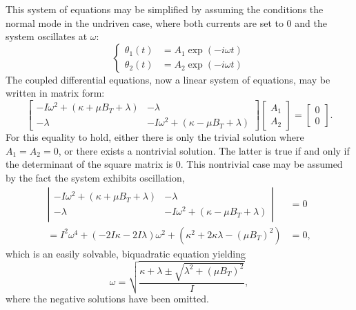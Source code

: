 \documentclass{article}
\begin{document}
This system of equations may be simplified by assuming the conditions the normal mode in the undriven case, where both currents are set to 0 and the system oscillates at $\omega$:
\begin{equation*}
  \begin{cases}
    \theta_1(t) &= A_1 \exp(-i\omega t) \\
    \theta_2(t) &= A_2 \exp(-i\omega t)
  \end{cases}
\end{equation*}
The coupled differential equations, now a linear system of equations, may be written in matrix form:
\begin{equation*}
  \left[
    \begin{matrix}
      -I\omega^2+(\kappa + \mu B_T + \lambda)   &   -\lambda \\
      -\lambda                                    &   -I\omega^2+(\kappa - \mu B_T + \lambda)
  \end{matrix} \right]\left[
    \begin{matrix} A_1 \\ A_2
  \end{matrix} \right] = \left[
    \begin{matrix} 0\\0
  \end{matrix} \right].
\end{equation*}
For this equality to hold, either there is only the trivial solution where $A_1=A_2=0$, or there exists a nontrivial solution. The latter is true if and only if the determinant of the square matrix is 0.
This nontrivial case may be assumed by the fact the system exhibits oscillation,
\begin{equation*}
  \begin{aligned}
    \left|
    \begin{matrix}
      -I\omega^2+(\kappa + \mu B_T + \lambda)   &   -\lambda \\
      -\lambda                                    &   -I\omega^2+(\kappa - \mu B_T + \lambda)
    \end{matrix} \right| &= 0 \\
    = I^2 \omega^4 + \left(-2I\kappa-2I\lambda \right)\omega^2 + \left(\kappa^2 + 2\kappa\lambda - (\mu B_T)^2\right) &= 0,
  \end{aligned}
\end{equation*}
which is an easily solvable, biquadratic equation yielding
\begin{equation}
  \omega = \sqrt{\frac{\kappa+\lambda \pm \sqrt{\lambda^2 + \left(\mu B_T\right)^2}}{I}},\label{eq:omegar}
\end{equation}
where the negative solutions have been omitted.
\end{document}
